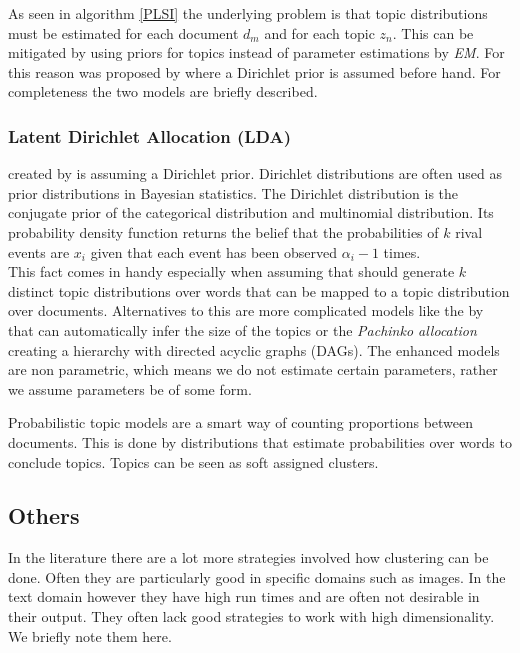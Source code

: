       As seen in algorithm \ref{PLSI} the underlying problem is that topic distributions must be estimated for each document $d_m$ and for each topic $z_n$. This can be mitigated by using priors for topics instead of parameter estimations by \emph{EM}. For this reason \ldafull{} was proposed by \cite{LDA2003} where a Dirichlet prior is assumed before hand. For completeness the two models are briefly described.

      \subsubsection*{Latent Dirichlet Allocation (LDA)}
      \label{sec:lda}

        \ldalong{} created by \cite{LDA2003} is \plsi{} assuming a Dirichlet prior. Dirichlet distributions are often used as prior distributions in Bayesian statistics. The Dirichlet distribution is the conjugate prior of the categorical distribution and multinomial distribution. Its probability density function returns the belief that the probabilities of $k$ rival events are $x_i$ given that each event has been observed $\alpha_i-1$ times.\\
        This fact comes in handy especially when assuming that \lda{} should generate $k$ distinct topic distributions over words that can be mapped to a topic distribution over documents. \cite{TopicModelsBlei2012}
        Alternatives to this are more complicated models like the \hdpfull{} by \cite{HDP2006} that can automatically infer the size of the topics or the \emph{Pachinko allocation} creating a hierarchy with directed acyclic graphs (DAGs). \cite{NonParametricBayes2007} The enhanced models are non parametric, which means we do not estimate certain parameters, rather we assume parameters be of some form.
        
      Probabilistic topic models are a smart way of counting proportions between documents. This is done by distributions that estimate probabilities over words to conclude topics. Topics can be seen as soft assigned clusters.

    \subsection{Others}
    In the literature there are a lot more strategies involved how clustering can be done. Often they are particularly good in specific domains such as images. In the text domain however they have high run times and are often not desirable in their output. They often lack good strategies to work with high dimensionality. We briefly note them here.

